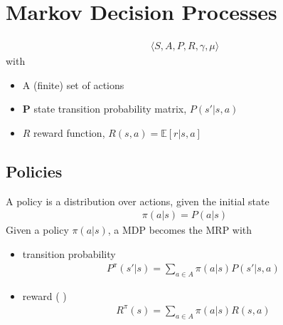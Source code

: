 \documentclass[letterpaper,10pt,english]{jupyterBook}
\begin{document}
\section{Markov Decision Processes}
\label{\detokenize{ch/rl/mdp:markov-decision-processes}}\begin{equation*}
\begin{split}\langle S, A, P, R, \gamma, \mu \rangle\end{split}
\end{equation*}
\sphinxAtStartPar
with
\begin{itemize}
\item {} 
\sphinxAtStartPar
A (finite) set of actions

\item {} 
\sphinxAtStartPar
\(\mathbf{P}\) state transition probability matrix, \(P(s'|s,a)\)

\item {} 
\sphinxAtStartPar
\(R\) reward function, \(R(s,a) = \mathbb{E}\left[ r | s, a \right]\)

\end{itemize}


\subsection{Policies}
\label{\detokenize{ch/rl/mdp:policies}}
\sphinxAtStartPar
A policy is a distribution over actions, given the initial state
\begin{equation*}
\begin{split}\pi(a|s) = P(a|s)\end{split}
\end{equation*}
\sphinxAtStartPar
Given a policy \(\pi(a|s)\), a MDP becomes the MRP with
\begin{itemize}
\item {} 
\sphinxAtStartPar
transition probability
\begin{equation*}
\begin{split}P^{\pi}(s'|s) = \sum_{a \in A} \pi(a|s) P(s'|s,a)\end{split}
\end{equation*}
\item {} 
\sphinxAtStartPar
reward ( )
\begin{equation*}
\begin{split}R^{\pi}(s) = \sum_{a \in A} \pi(a|s) R(s,a)\end{split}
\end{equation*}
\end{itemize}
\end{document}
